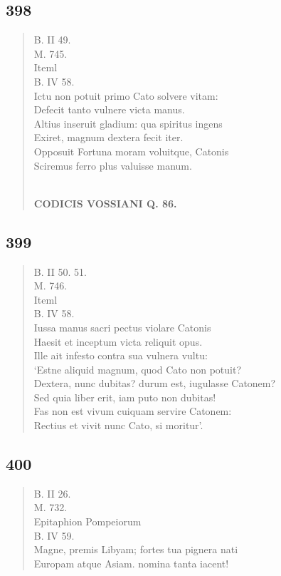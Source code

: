 \documentclass[11pt, a4paper]{report}
\begin{document}
            \subsection*{398}
      \begin{verse}
      B. II 49. \\ M. 745. \\  \lbrack Iteml \\ B. IV 58. \\ Ictu non potuit primo Cato solvere vitam: \\ Defecit tanto vulnere victa manus. \\ Altius inseruit gladium: qua spiritus ingens \\ Exiret, magnum dextera fecit iter. \\ Opposuit Fortuna moram voluitque, Catonis \\ Sciremus ferro plus valuisse manum. \\ 
        ﻿\pagebreak 
    \begin{center} \textbf{CODICIS VOSSIANI Q. 86.} \end{center}
      \end{verse}
  
            \subsection*{399}
      \begin{verse}
      B. II 50. 51. \\ M. 746. \\  \lbrack Iteml \\ B. IV 58. \\ Iussa manus sacri pectus violare Catonis \\ Haesit et inceptum victa reliquit opus. \\ Ille ait infesto contra sua vulnera vultu: \\ ‘Estne aliquid magnum, quod Cato non potuit? \\ Dextera, nunc dubitas? durum est, iugulasse Catonem? \\ Sed quia liber erit, iam puto non dubitas! \\ Fas non est vivum cuiquam servire Catonem: \\ Rectius et vivit nunc Cato, si moritur’. \\ 
      \end{verse}
  
            \subsection*{400}
      \begin{verse}
      B. II 26. \\ M. 732. \\ Epitaphion Pompeiorum \\ B. IV 59. \\ Magne, premis Libyam; fortes tua pignera nati \\ Europam atque Asiam. nomina tanta iacent! \\ 
      \end{verse}
  
\end{document}
